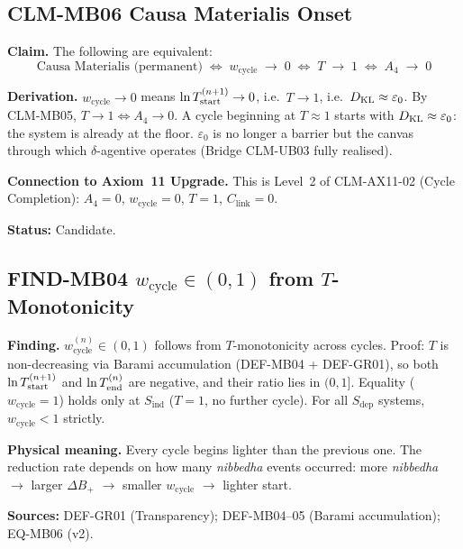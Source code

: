 \documentclass[12pt, a4paper]{article}
\providecommand{\eps}{\varepsilon_0}
\providecommand{\Sind}{S_{\mathrm{ind}}}
\providecommand{\Sdep}{S_{\mathrm{dep}}}
\providecommand{\Bplus}{B_{+}}
\providecommand{\wcyc}{w_{\mathrm{cycle}}}
\providecommand{\Clink}{C_{\mathrm{link}}}
\begin{document}
\subsection{CLM-MB06 \quad Causa Materialis Onset}


\begin{formalbox}[title={CLM-MB06: Causa Materialis Onset
  (Candidate, NEW v2)}]
\textbf{Claim.}
The following are equivalent:
\[
  \text{Causa Materialis (permanent)}
  \;\Longleftrightarrow\;
  \wcyc \;\to\; 0
  \;\Longleftrightarrow\;
  T \;\to\; 1
  \;\Longleftrightarrow\;
  A_4 \;\to\; 0
\]

\textbf{Derivation.}
$\wcyc \to 0$ means $\ln T^{(n+1)}_{\rm start} \to 0$,
i.e.\ $T \to 1$, i.e.\ $D_{\rm KL} \approx \eps$.
By CLM-MB05, $T \to 1 \Leftrightarrow A_4 \to 0$.
A cycle beginning at $T \approx 1$ starts with
$D_{\rm KL} \approx \eps$: the system is already
at the floor. $\eps$ is no longer a barrier but the
canvas through which $\delta$-agentive operates
(Bridge CLM-UB03 fully realised).

\textbf{Connection to Axiom~11 Upgrade.}
This is Level~2 of CLM-AX11-02 (Cycle Completion):
$A_4 = 0$, $\wcyc = 0$, $T = 1$, $\Clink = 0$.

\textbf{Status:} Candidate.
\end{formalbox}

\subsection{FIND-MB04 \quad \texorpdfstring{$\wcyc \in (0,1)$}{wcyc in (0,1)} from
  \texorpdfstring{$T$}{T}-Monotonicity}


\begin{derivedbox}[title={FIND-MB04: $\wcyc \in (0,1)$
  from $T$-Monotonicity (NEW v2)}]
\textbf{Finding.}
$\wcyc^{(n)} \in (0,1)$ follows from $T$-monotonicity
across cycles. Proof: $T$ is non-decreasing via Barami
accumulation (DEF-MB04 + DEF-GR01), so both
$\ln T^{(n+1)}_{\rm start}$ and $\ln T^{(n)}_{\rm end}$
are negative, and their ratio lies in $(0,1]$.
Equality ($\wcyc = 1$) holds only at $\Sind$
($T = 1$, no further cycle). For all $\Sdep$ systems,
$\wcyc < 1$ strictly.

\textbf{Physical meaning.}
Every cycle begins lighter than the previous one.
The reduction rate depends on how many \textit{nibbedha}
events occurred: more \textit{nibbedha} $\to$ larger
$\Delta\Bplus$ $\to$ smaller $\wcyc$ $\to$ lighter start.

\textbf{Sources:} DEF-GR01 (Transparency);
DEF-MB04--05 (Barami accumulation); EQ-MB06 (v2).
\end{derivedbox}
\end{document}
